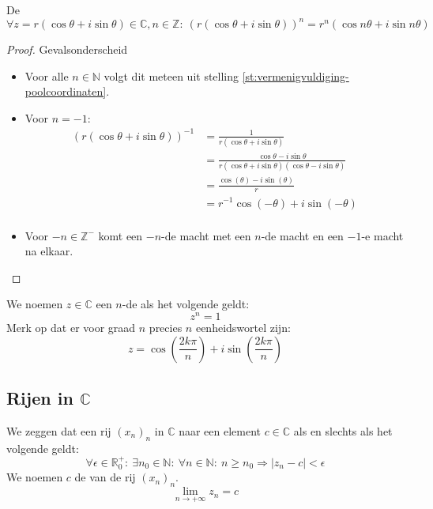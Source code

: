 \documentclass[main.tex]{subfiles}
\begin{document}
\begin{st}
  De \\
  \[ \forall z = r(\cos \theta + i \sin \theta) \in \mathbb{C}, n\in \mathbb{Z}:\ (r(\cos \theta + i \sin \theta))^{n} = r^{n}(\cos n\theta + i \sin n\theta)\]

  \begin{proof}
    Gevalsonderscheid
    \begin{itemize}
    \item Voor alle $n\in \mathbb{N}$ volgt dit meteen uit stelling
      \ref{st:vermenigvuldiging-poolcoordinaten}.
    \item Voor $n=-1$:
      \[
      \begin{array}{rl}
        (r(\cos \theta + i \sin \theta))^{-1}
        &= \frac{1}{r(\cos \theta + i \sin \theta)}\\
        &= \frac{\cos \theta - i \sin \theta}{r(\cos \theta + i \sin \theta)(\cos \theta - i \sin \theta)}\\
        &= \frac{\cos(\theta) - i\sin(\theta)}{r}\\
        &= r^{-1}\cos(-\theta) + i\sin(-\theta)\\
      \end{array}
      \]
    \item Voor $-n\in \mathbb{Z}^{-}$ komt een $-n$-de macht met een $n$-de macht en een $-1$-e macht na elkaar.
    \end{itemize}
  \end{proof}
\end{st}


\begin{de}
  We noemen $z\in \mathbb{C}$ een $n$-de  als het volgende geldt:
  \[ z^{n} = 1 \]
  Merk op dat er voor graad $n$ precies $n$ eenheidswortel zijn:
  \[ z = \cos\left(\frac{2k\pi}{n}\right) + i \sin \left( \frac{2k\pi}{n} \right) \]
\end{de}


\subsection{Rijen in $\mathbb{C}$}
\label{sec:rijen-mathbbc}

\begin{de}
  We zeggen dat een rij $(x_{n})_{n}$ in $\mathbb{C}$  naar een element $c\in \mathbb{C}$ als en slechts als het volgende geldt:
  \[ \forall \epsilon \in \mathbb{R}_{0}^{+}:\ \exists n_{0}\in \mathbb{N}:\ \forall n\in \mathbb{N}:\ n \ge n_{0} \Rightarrow |z_{n}-c| < \epsilon \]
  We noemen $c$ de  van de rij $(x_{n})_{n}$.
  \[ \lim_{n\rightarrow +\infty}z_{n} = c \]
\end{de}
\end{document}

